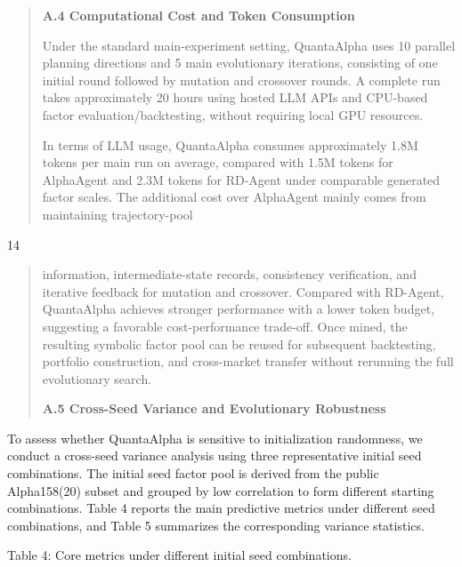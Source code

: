 \documentclass[
]{article}
\begin{document}
\begin{quote}
\textbf{A.4 Computational Cost and Token Consumption}

Under the standard main-experiment setting, QuantaAlpha uses 10 parallel
planning directions and 5 main evolutionary iterations, consisting of
one initial round followed by mutation and crossover rounds. A complete
run takes approximately 20 hours using hosted LLM APIs and CPU-based
factor evaluation/backtesting, without requiring local GPU resources.

In terms of LLM usage, QuantaAlpha consumes approximately 1.8M tokens
per main run on average, compared with 1.5M tokens for AlphaAgent and
2.3M tokens for RD-Agent under comparable generated factor scales. The
additional cost over AlphaAgent mainly comes from maintaining
trajectory-pool
\end{quote}

14

\begin{quote}
information, intermediate-state records, consistency verification, and
iterative feedback for mutation and crossover. Compared with RD-Agent,
QuantaAlpha achieves stronger performance with a lower token budget,
suggesting a favorable cost-performance trade-off. Once mined, the
resulting symbolic factor pool can be reused for subsequent backtesting,
portfolio construction, and cross-market transfer without rerunning the
full evolutionary search.

\textbf{A.5 Cross-Seed Variance and Evolutionary Robustness}
\end{quote}

To assess whether QuantaAlpha is sensitive to initialization randomness,
we conduct a cross-seed variance analysis using three representative
initial seed combinations. The initial seed factor pool is derived from
the public Alpha158(20) subset and grouped by low correlation to form
different starting combinations. Table 4 reports the main predictive
metrics under different seed combinations, and Table 5 summarizes the
corresponding variance statistics.

Table 4: Core metrics under different initial seed combinations.
\end{document}

